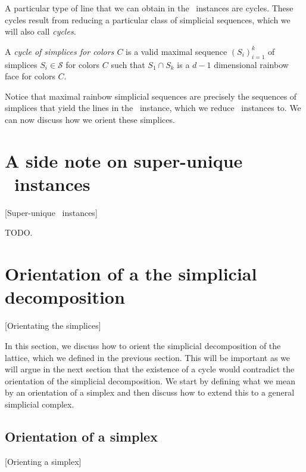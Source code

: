 A particular type of line that we can obtain in the \EndOfLine\ instances are cycles. These cycles result from reducing a particular class of simplicial sequences, which we will also call \emph{cycles}.

\begin{definition}[Cycle]
	A \emph{cycle of simplices for colors $C$} is a valid maximal sequence $\left(S_i\right)_{i=1}^{k}$ of simplices $S_i \in \mathcal{S}$ for colors $C$ such that $S_1 \cap S_k$ is a $d-1$ dimensional rainbow face for colors $C$.
\end{definition}

Notice that maximal rainbow simplicial sequences are precisely the sequences of simplices that yield the lines in the \EndOfLine\ instance, which we reduce \Sperner\ instances to. We can now discuss how we orient these simplices.

\section{A side note on super-unique \Tarski\ instances}[Super-unique \Tarski\ instances]

TODO.

\section{Orientation of a the simplicial decomposition}[Orientating the simplices]

In this section, we discuss how to orient the simplicial decomposition of the lattice, which we defined in the previous section. This will be important as we will argue in the next section that the existence of a cycle would contradict the orientation of the simplicial decomposition. We start by defining what we mean by an orientation of a simplex and then discuss how to extend this to a general simplicial complex.

\subsection{Orientation of a simplex}[Orienting a simplex]
\label{sec:orientation_of_simplex}

